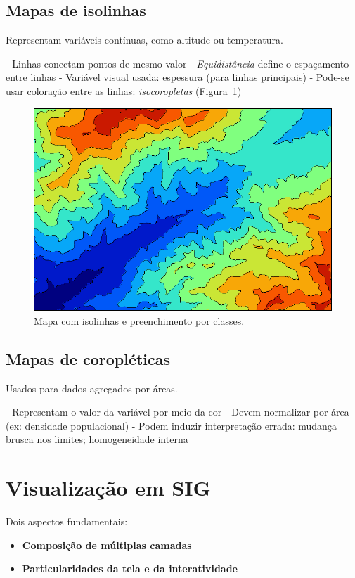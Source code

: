 \subsection{Mapas de isolinhas}

Representam variáveis contínuas, como altitude ou temperatura.

- Linhas conectam pontos de mesmo valor
- \emph{Equidistância} define o espaçamento entre linhas
- Variável visual usada: espessura (para linhas principais)
- Pode-se usar coloração entre as linhas: \emph{isocoropletas} (Figura~\ref{Fig:Isolineas})

\begin{figure}[!hbt]
\centering
\includegraphics[width=.8\columnwidth]{Visualizacao/Isolineas.png}
\caption{\small Mapa com isolinhas e preenchimento por classes.}
\label{Fig:Isolineas} 
\end{figure}

\subsection{Mapas de coropléticas}

Usados para dados agregados por áreas.

- Representam o valor da variável por meio da cor
- Devem normalizar por área (ex: densidade populacional)
- Podem induzir interpretação errada: mudança brusca nos limites; homogeneidade interna

\section{Visualização em SIG}

Dois aspectos fundamentais:

\begin{itemize}
 \item \textbf{Composição de múltiplas camadas}
 \item \textbf{Particularidades da tela e da interatividade}
\end{itemize}

